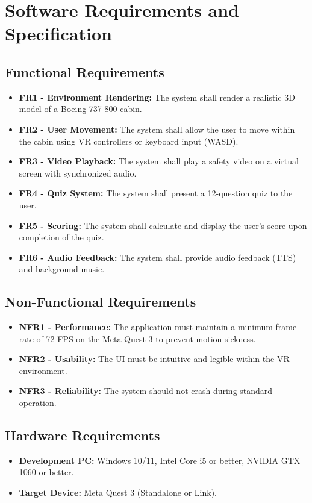 \chapter{Software Requirements and Specification}

\section{Functional Requirements}
\begin{itemize}
    \item \textbf{FR1 - Environment Rendering:} The system shall render a realistic 3D model of a Boeing 737-800 cabin.
    \item \textbf{FR2 - User Movement:} The system shall allow the user to move within the cabin using VR controllers or keyboard input (WASD).
    \item \textbf{FR3 - Video Playback:} The system shall play a safety video on a virtual screen with synchronized audio.
    \item \textbf{FR4 - Quiz System:} The system shall present a 12-question quiz to the user.
    \item \textbf{FR5 - Scoring:} The system shall calculate and display the user's score upon completion of the quiz.
    \item \textbf{FR6 - Audio Feedback:} The system shall provide audio feedback (TTS) and background music.
\end{itemize}

\section{Non-Functional Requirements}
\begin{itemize}
    \item \textbf{NFR1 - Performance:} The application must maintain a minimum frame rate of 72 FPS on the Meta Quest 3 to prevent motion sickness.
    \item \textbf{NFR2 - Usability:} The UI must be intuitive and legible within the VR environment.
    \item \textbf{NFR3 - Reliability:} The system should not crash during standard operation.
\end{itemize}

\section{Hardware Requirements}
\begin{itemize}
    \item \textbf{Development PC:} Windows 10/11, Intel Core i5 or better, NVIDIA GTX 1060 or better.
    \item \textbf{Target Device:} Meta Quest 3 (Standalone or Link).
\end{itemize}

